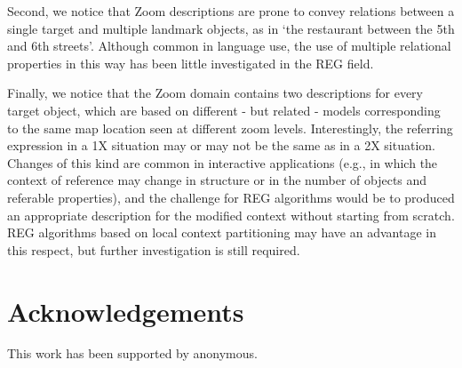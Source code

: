 \documentclass[11pt]{article}
\begin{document}
Second, we notice that Zoom descriptions are prone to convey relations between a single target and multiple landmark objects, as in `the restaurant between the 5th and 6th streets'. Although common in language use, the use of multiple relational properties in this way has been little investigated in the REG field. 

Finally, we notice that the Zoom domain contains two descriptions for every target object, which are based on different - but related - models corresponding to the same map location seen at different zoom levels. Interestingly, the referring expression in a 1X situation may or may not be the same as in a 2X situation. Changes of this kind are common in interactive applications (e.g., in which the context of reference may change in structure or in the number of objects and referable properties), and the challenge for REG algorithms would be to produced an appropriate description for the modified context without starting from scratch. REG algorithms based on local context partitioning \cite{areces08} may have an advantage in this respect, but further investigation is still required.


\section*{Acknowledgements}
This work has been supported by anonymous. 

\clearpage


\end{document}
